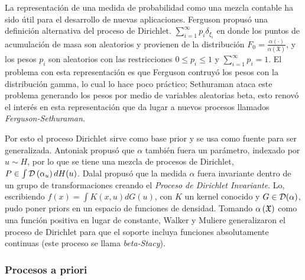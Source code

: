 \documentclass[runningheads,a4paper]{article}
\begin{document}
La representación de una medida de probabilidad como una mezcla contable ha sido útil para el desarrollo de nuevas aplicaciones. %
Ferguson propusó una definición alternativa del proceso de Dirichlet. $\sum_{i = 1}^{\infty} p_{i}\delta_{\xi_{i}}$ en donde %
los puntos de acumulación de masa son aleatorios y provienen de la distribución $F_{0} = \frac{\alpha(\cdot)}{\alpha\left( %
\mathfrak{X} \right)}$, y los pesos $p_i$ son aleatorios con las restricciones $0 \leq p_{i} \leq 1$ y $\sum_{i = 1}^{\infty}%
p_{i} = 1$. El problema con esta representación es que Ferguson contruyó los pesos con la distribución gamma, lo cual lo hace %
poco práctico; Sethuraman ataca este problema generando los pesos por medio de variables aleatorias beta, esto renovó el interés %
en esta representación que da lugar a nuevos procesos llamados \textit{Ferguson-Sethuraman}.

Por esto el proceso Dirichlet sirve como base prior y se usa como fuente para ser generalizada. Antoniak propusó que $\alpha$ %
también fuera un parámetro, indexado por $u \sim H$, por lo que se tiene una mezcla de procesos de Dirichlet, $P \in \int %
\D\left( \alpha_{u} \right) dH(u)$. Dalal propusó que la medida $\alpha$ fuera invariante dentro de un grupo de transformaciones %
creando el \textit{Proceso de Dirichlet Invariante}. Lo, escribiendo $f(x) = \int K(x, u) dG(u)$, con $K$ un kernel conocido %
y $G \in \mathcal{D}(\alpha)$, pudo poner priors en un espacio de funciones de densidad. Tomando $\alpha\left( \mathfrak{X} \right)$ como una función %
positiva en lugar de constante, Walker y Muliere generalizaron el proceso de Dirichlet para que el soporte incluya funciones %
absolutamente continuas (este proceso se llama \textit{beta-Stacy}).

\subsubsection{Procesos a priori}
\end{document}

